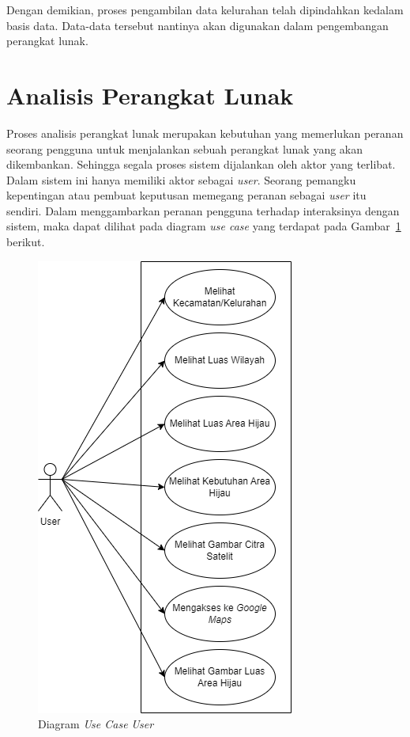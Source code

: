 Dengan demikian, proses pengambilan data kelurahan telah dipindahkan kedalam basis data. Data-data tersebut nantinya akan digunakan dalam pengembangan perangkat lunak.  


\section{Analisis Perangkat Lunak}
Proses analisis perangkat lunak merupakan kebutuhan yang memerlukan peranan seorang pengguna untuk menjalankan sebuah perangkat lunak yang akan dikembankan. Sehingga segala proses sistem dijalankan oleh aktor yang terlibat. Dalam sistem ini hanya memiliki aktor sebagai \textit{user}. Seorang pemangku kepentingan atau pembuat keputusan memegang peranan sebagai \textit{user} itu sendiri. Dalam menggambarkan peranan pengguna terhadap interaksinya dengan sistem, maka dapat dilihat pada diagram \textit{use case} yang terdapat pada Gambar~\ref{fig:useCaseUser} berikut.

\begin{figure}[H]
	\centering
	\includegraphics[scale=0.5]{Gambar/UseCaseUser.png}
	\caption[Diagram \textit{Use Case} \textit{User}]{Diagram \textit{Use Case} \textit{User}}
	\label{fig:useCaseUser}
\end{figure}


